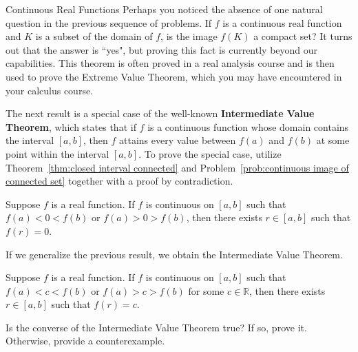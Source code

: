 \begin{section}{Continuous Real Functions}
Perhaps you noticed the absence of one natural question in the previous sequence of problems. If $f$ is a continuous real function and $K$ is a subset of the domain of $f$, is the image $f(K)$ a compact set?  It turns out that the answer is ``yes", but proving this fact is currently beyond our capabilities. This theorem is often proved in a real analysis course and is then used to prove the Extreme Value Theorem, which you may have encountered in your calculus course.

The next result is a special case of the well-known \textbf{Intermediate Value Theorem}, which states that if $f$ is a continuous function whose domain contains the interval $[a,b]$, then $f$ attains every value between $f(a)$ and $f(b)$ at some point within the interval $[a,b]$. To prove the special case, utilize Theorem~\ref{thm:closed interval connected} and Problem~\ref{prob:continuous image of connected set} together with a proof by contradiction.

\begin{theorem}
Suppose $f$ is a real function. If $f$ is continuous on $[a,b]$ such that $f(a)<0<f(b)$ or $f(a)>0>f(b)$, then there exists $r\in [a,b]$ such that $f(r)=0$.
\end{theorem}

If we generalize the previous result, we obtain the Intermediate Value Theorem.

\begin{theorem}
Suppose $f$ is a real function. If $f$ is continuous on $[a,b]$ such that $f(a)<c<f(b)$ or $f(a)>c>f(b)$ for some $c\in \mathbb{R}$, then there exists $r\in [a,b]$ such that $f(r)=c$.
\end{theorem}

\begin{problem}
Is the converse of the Intermediate Value Theorem true? If so, prove it.  Otherwise, provide a counterexample.
\end{problem}

\end{section}